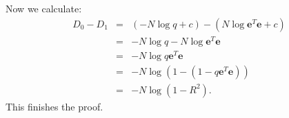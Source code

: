 \documentclass[a4paper, 11pt]{article}
\begin{document}
Now we calculate:
\begin{eqnarray}
D_0 - D_1 &=& (-N \log q + c) - (N \log \mathbf{e}^T \mathbf{e} + c) \nonumber \\
&=& -N \log q - N \log \mathbf{e}^T \mathbf{e} \nonumber \\ 
&=& -N  \log q \mathbf{e}^T \mathbf{e} \nonumber \\ 
&=& -N  \log \left(1 - (1 - q \mathbf{e}^T \mathbf{e})\right) \nonumber \\ 
&=& -N  \log \left(1 - R^2 \right). \nonumber
\end{eqnarray}
This finishes the proof.
\end{document}
